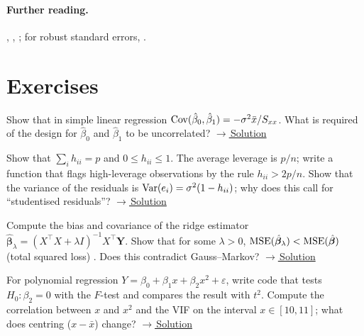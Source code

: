 \documentclass[main.tex]{subfiles}
\begin{document}
\paragraph{Further reading.} \cite{seber}, \cite[Chapters~11--12]{casella}, \cite[Chapter~13]{wasserman}; for robust standard errors, \cite{white}.

\section{Exercises}

\begin{exercise}\label{exr:17-1}
Show that in simple linear regression $\operatorname{Cov}(\hat\beta_0,\hat\beta_1)=-\sigma^2\bar x/S_{xx}$. What is required of the design for $\hat\beta_0$ and $\hat\beta_1$ to be uncorrelated?
\hfill\hyperref[coz:17-1]{\footnotesize$\rightarrow$\,Solution}
\end{exercise}

\begin{exercise}\label{exr:17-2}
Show that $\sum_ih_{ii}=p$ and $0\le h_{ii}\le1$. The average leverage is $p/n$; write a function that flags high-leverage observations by the rule $h_{ii}>2p/n$. Show that the variance of the residuals is $\operatorname{Var}(e_i)=\sigma^2(1-h_{ii})$; why does this call for ``studentised residuals''?
\hfill\hyperref[coz:17-2]{\footnotesize$\rightarrow$\,Solution}
\end{exercise}

\begin{exercise}\label{exr:17-3}
Compute the bias and covariance of the ridge estimator $\hat{\bm\beta}_\lambda=(X^\top X+\lambda I)^{-1}X^\top\mathbf Y$. Show that for some $\lambda>0$, $\operatorname{MSE}(\hat{\bm\beta}_\lambda)<\operatorname{MSE}(\hat{\bm\beta})$ (total squared loss) \cite{hoerl70}. Does this contradict Gauss--Markov?
\hfill\hyperref[coz:17-3]{\footnotesize$\rightarrow$\,Solution}
\end{exercise}

\begin{exercise}\label{exr:17-4}
For polynomial regression $Y=\beta_0+\beta_1x+\beta_2x^2+\varepsilon$, write code that tests $H_0:\beta_2=0$ with the $F$-test and compares the result with $t^2$. Compute the correlation between $x$ and $x^2$ and the VIF on the interval $x\in[10,11]$; what does centring ($x-\bar x$) change?
\hfill\hyperref[coz:17-4]{\footnotesize$\rightarrow$\,Solution}
\end{exercise}

\end{document}
